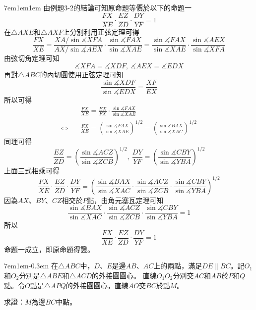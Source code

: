 \documentclass[12pt]{article}
\begin{document}
\begin{mybox}[Answer 10*]{7em}{1em}{1em}
    由例題3-2的結論可知原命題等價於以下的命題一
    $$
        \frac{FX}{XE}\cdot\frac{EZ}{ZD}\cdot\frac{DY}{YF}=1
    $$
    在$\triangle{AXE}$和$\triangle{AXF}$上分別利用正弦定理可得
    $$
        \frac{FX}{XE}=\frac{XA/\sin{\measuredangle{XFA}}}{AX/\sin{\measuredangle{AEX}}}
        \cdot\frac{\sin{\measuredangle{FAX}}}{\sin{\measuredangle{XAE}}}
        =\frac{\sin{\measuredangle{FAX}}}{\sin{\measuredangle{XAE}}}\cdot\frac{\sin{\measuredangle{AEX}}}{\sin{\measuredangle{XFA}}}
    $$
    由弦切角定理可知
    $$
        \measuredangle{XFA}=\measuredangle{XDF},\ \measuredangle{AEX}=\measuredangle{EDX}
    $$
    再對$\triangle{ABC}$的內切圓使用正弦定理可知
    $$
        \frac{\sin{\measuredangle{XDF}}}{\sin{\measuredangle{EDX}}}=\frac{XF}{EX}
    $$
    所以可得
    \begin{align*}
        &\frac{FX}{XE}=\frac{EX}{FX}\cdot\frac{\sin{\measuredangle{FAX}}}{\sin{\measuredangle{XAE}}}\\
        \Leftrightarrow\quad&\frac{FX}{XE}=\left(\frac{\sin{\measuredangle{FAX}}}{\sin{\measuredangle{XAE}}}\right)^{1/2}
        =\left(\frac{\sin{\measuredangle{BAX}}}{\sin{\measuredangle{XAC}}}\right)^{1/2}
    \end{align*}
    同理可得
    $$
        \frac{EZ}{ZD}=\left(\frac{\sin{\measuredangle{ACZ}}}{\sin{\measuredangle{ZCB}}}\right)^{1/2},\ 
        \frac{DY}{YF}=\left(\frac{\sin{\measuredangle{CBY}}}{\sin{\measuredangle{YBA}}}\right)^{1/2}
    $$
    上面三式相乘可得
    $$
        \frac{FX}{XE}\cdot\frac{EZ}{ZD}\cdot\frac{DY}{YF}
        =\left(\frac{\sin{\measuredangle{BAX}}}{\sin{\measuredangle{XAC}}}
        \cdot\frac{\sin{\measuredangle{ACZ}}}{\sin{\measuredangle{ZCB}}}
        \cdot\frac{\sin{\measuredangle{CBY}}}{\sin{\measuredangle{YBA}}}\right)^{1/2}
    $$
    因為$AX$、$BY$、$CZ$相交於$P$點，由角元塞瓦定理可知
    $$
        \frac{\sin{\measuredangle{BAX}}}{\sin{\measuredangle{XAC}}}
        \cdot\frac{\sin{\measuredangle{ACZ}}}{\sin{\measuredangle{ZCB}}}
        \cdot\frac{\sin{\measuredangle{CBY}}}{\sin{\measuredangle{YBA}}}=1
    $$
    所以
    $$
        \frac{FX}{XE}\cdot\frac{EZ}{ZD}\cdot\frac{DY}{YF}=1
    $$
    命題一成立，即原命題得證。
\end{mybox}
\begin{mybox}[Problem 11*]{7em}{1em}{-0.3em}
   在$\triangle{ABC}$中，$D$、$E$是邊$AB$、$AC$上的兩點，滿足$DE\parallel BC$。記$O_1$和$O_2$分別是$\triangle{ABE}$和$\triangle{ACD}$的外接圓圓心。
   直線$O_1O_2$分別交$AC$和$AB$於$P$和$Q$點。令$O$點是$\triangle{APQ}$的外接圓圓心，直線$AO$交$BC$於點$M$。
   
   求證：$M$為邊$BC$中點。
\end{mybox}
\end{document}
